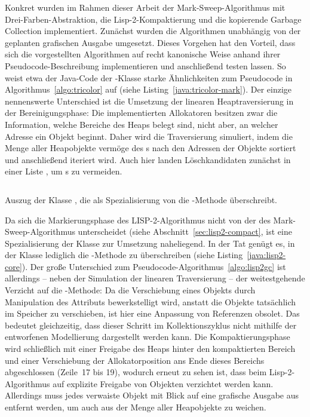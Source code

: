 Konkret wurden im Rahmen dieser Arbeit der Mark-Sweep-Algorithmus mit Drei-Farben-Abstraktion, die Lisp-2-Kompaktierung und die kopierende Garbage Collection implementiert.
Zunächst wurden die Algorithmen unabhängig von der geplanten grafischen Ausgabe umgesetzt.
Dieses Vorgehen hat den Vorteil, dass sich die vorgestellten Algorithmen auf recht kanonische Weise anhand ihrer Pseudocode-Beschreibung implementieren und anschließend testen lassen.
So weist etwa der Java-Code der -Klasse starke Ähnlichkeiten zum Pseudocode in Algorithmus~\ref{algo:tricolor} auf (siehe Listing~\ref{java:tricolor-mark}).
Der einzige nennenswerte Unterschied ist die Umsetzung der linearen Heaptraversierung in der Bereinigungsphase:
Die implementierten Allokatoren besitzen zwar die Information, welche Bereiche des Heaps belegt sind, nicht aber, an welcher Adresse ein Objekt beginnt.
Daher wird die Traversierung simuliert, indem die Menge  aller Heapobjekte vermöge des s nach den Adressen der Objekte sortiert und anschließend iteriert wird.
Auch hier landen Löschkandidaten zunächst in einer Liste , um s zu vermeiden.

\begin{listing}[t!]
	\inputminted[]{java}{code/Lisp2-core.java}
	\caption[Auszug der Klasse ]{Auszug der Klasse , die als Spezialisierung von  die -Methode überschreibt.}
	\label{java:lisp2-core}
\end{listing}

Da sich die Markierungsphase des LISP-2-Algorithmus nicht von der des Mark-Sweep-Algorithmus unterscheidet (siehe Abschnitt~\ref{sec:lisp2-compact}, ist eine Spezialisierung der Klasse  zur Umsetzung naheliegend.
In der Tat genügt es, in der Klasse lediglich die -Methode zu überschreiben (siehe Listing~\ref{java:lisp2-core}).
Der große Unterschied zum Pseudocode-Algorithmus~\ref{algo:lisp2gc} ist allerdings -- neben der Simulation der linearen Traversierung -- der weitestgehende Verzicht auf die -Methode:
Da die Verschiebung eines Objekts durch Manipulation des Attributs  bewerkstelligt wird, anstatt die Objekte tatsächlich im Speicher zu verschieben, ist hier eine Anpassung von Referenzen obsolet.
Das bedeutet gleichzeitig, dass dieser Schritt im Kollektionszyklus nicht mithilfe der entworfenen Modellierung dargestellt werden kann.
Die Kompaktierungsphase wird schließlich mit einer Freigabe des Heaps hinter den kompaktierten Bereich und einer Verschiebung der Allokatorposition ans Ende dieses Bereichs abgeschlossen (Zeile~17 bis 19), wodurch erneut zu sehen ist, dass beim Lisp-2-Algorithmus auf explizite Freigabe von Objekten verzichtet werden kann.
Allerdings muss jedes verwaiste Objekt mit Blick auf eine grafische Ausgabe aus  entfernt werden, um auch aus der Menge aller Heapobjekte zu weichen.

